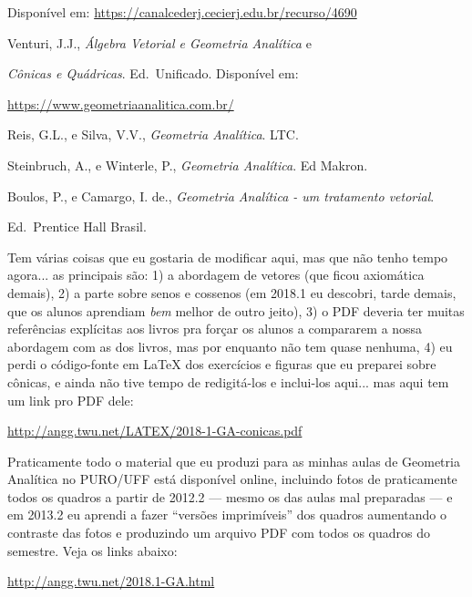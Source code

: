 \documentclass[oneside]{book}
\begin{document}
Disponível em:
\url{https://canalcederj.cecierj.edu.br/recurso/4690}

\ssk

Venturi, J.J., {\sl Álgebra Vetorial e Geometria Analítica} e

{\sl Cônicas e Quádricas}. Ed.\ Unificado. Disponível em:

\url{https://www.geometriaanalitica.com.br/}

\ssk

Reis, G.L., e Silva, V.V., {\sl Geometria Analítica}. LTC.

\ssk

Steinbruch, A., e Winterle, P., {\sl Geometria Analítica}. Ed Makron.

\ssk

Boulos, P., e Camargo, I. de., {\sl Geometria Analítica - um
  tratamento vetorial}.

Ed.\ Prentice Hall Brasil.


\msk

Tem várias coisas que eu gostaria de modificar aqui, mas que não tenho
tempo agora... as principais são: 1) a abordagem de vetores (que ficou
axiomática demais), 2) a parte sobre senos e cossenos (em 2018.1 eu
descobri, tarde demais, que os alunos aprendiam {\sl bem} melhor de
outro jeito), 3) o PDF deveria ter muitas referências explícitas aos
livros pra forçar os alunos a compararem a nossa abordagem com as dos
livros, mas por enquanto não tem quase nenhuma, 4) eu perdi o
código-fonte em \LaTeX{} dos exercícios e figuras que eu preparei
sobre cônicas, e ainda não tive tempo de redigitá-los e inclui-los
aqui... mas aqui tem um link pro PDF dele:

\msk

\url{http://angg.twu.net/LATEX/2018-1-GA-conicas.pdf}

\bsk

Praticamente todo o material que eu produzi para as minhas aulas de
Geometria Analítica no PURO/UFF está disponível online, incluindo
fotos de praticamente todos os quadros a partir de 2012.2 --- mesmo os
das aulas mal preparadas --- e em 2013.2 eu aprendi a fazer ``versões
imprimíveis'' dos quadros aumentando o contraste das fotos e
produzindo um arquivo PDF com todos os quadros do semestre. Veja os
links abaixo:

\msk

\url{http://angg.twu.net/2018.1-GA.html}
\end{document}
